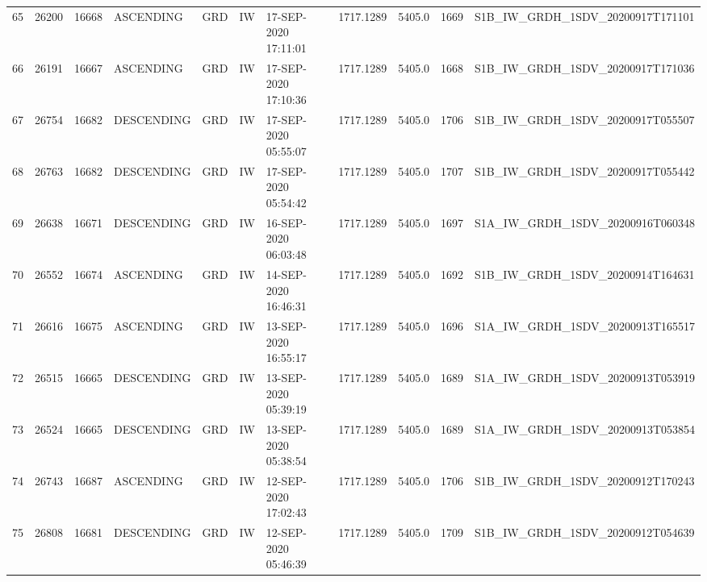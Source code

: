 \begin{tabular}{lrrllllllll}
65  &  26200 &   16668 &   ASCENDING &          GRD &              IW &  17-SEP-2020 17:11:01 &                  1717.1289 &          5405.0 &       1669 &  S1B\_IW\_GRDH\_1SDV\_20200917T171101 \\
66  &  26191 &   16667 &   ASCENDING &          GRD &              IW &  17-SEP-2020 17:10:36 &                  1717.1289 &          5405.0 &       1668 &  S1B\_IW\_GRDH\_1SDV\_20200917T171036 \\
67  &  26754 &   16682 &  DESCENDING &          GRD &              IW &  17-SEP-2020 05:55:07 &                  1717.1289 &          5405.0 &       1706 &  S1B\_IW\_GRDH\_1SDV\_20200917T055507 \\
68  &  26763 &   16682 &  DESCENDING &          GRD &              IW &  17-SEP-2020 05:54:42 &                  1717.1289 &          5405.0 &       1707 &  S1B\_IW\_GRDH\_1SDV\_20200917T055442 \\
69  &  26638 &   16671 &  DESCENDING &          GRD &              IW &  16-SEP-2020 06:03:48 &                  1717.1289 &          5405.0 &       1697 &  S1A\_IW\_GRDH\_1SDV\_20200916T060348 \\
70  &  26552 &   16674 &   ASCENDING &          GRD &              IW &  14-SEP-2020 16:46:31 &                  1717.1289 &          5405.0 &       1692 &  S1B\_IW\_GRDH\_1SDV\_20200914T164631 \\
71  &  26616 &   16675 &   ASCENDING &          GRD &              IW &  13-SEP-2020 16:55:17 &                  1717.1289 &          5405.0 &       1696 &  S1A\_IW\_GRDH\_1SDV\_20200913T165517 \\
72  &  26515 &   16665 &  DESCENDING &          GRD &              IW &  13-SEP-2020 05:39:19 &                  1717.1289 &          5405.0 &       1689 &  S1A\_IW\_GRDH\_1SDV\_20200913T053919 \\
73  &  26524 &   16665 &  DESCENDING &          GRD &              IW &  13-SEP-2020 05:38:54 &                  1717.1289 &          5405.0 &       1689 &  S1A\_IW\_GRDH\_1SDV\_20200913T053854 \\
74  &  26743 &   16687 &   ASCENDING &          GRD &              IW &  12-SEP-2020 17:02:43 &                  1717.1289 &          5405.0 &       1706 &  S1B\_IW\_GRDH\_1SDV\_20200912T170243 \\
75  &  26808 &   16681 &  DESCENDING &          GRD &              IW &  12-SEP-2020 05:46:39 &                  1717.1289 &          5405.0 &       1709 &  S1B\_IW\_GRDH\_1SDV\_20200912T054639 \\

\end{tabular}
